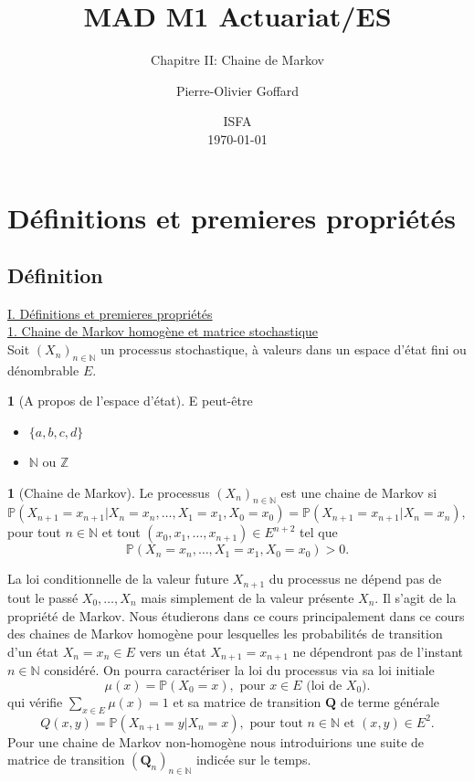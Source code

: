 \documentclass[8pt,notheorems]{beamer}
\title[]{MAD M1 Actuariat/ES}
\subtitle{Chapitre II: Chaine de Markov}
\author{Pierre-Olivier Goffard}
\institute{
	   Université de Lyon 1\\
	ISFA\\
	   \texttt{pierre-olivier.goffard@univ-lyon1.fr}
	  }
\date{
ISFA\\
\today}
\def \N{\mathbb N}
\def \P {\mathbb P}
\theoremstyle{definition}
\newtheorem{definition}{\translate{Definition}}
\theoremstyle{example}
\newtheorem{example}{\translate{Exemple}}
\theoremstyle{mystyle}
\theoremstyle{plain}
\begin{document}
\frame{\titlepage}


\section{Définitions et premieres propriétés}
\subsection{Définition}
\begin{frame}[allowframebreaks]
\underline{I. Définitions et premieres propriétés}\\
\underline{1. Chaine de Markov homogène et matrice stochastique}\\
Soit $(X_n)_{n\in\mathbb{N}}$ un processus stochastique, à valeurs dans un espace d'état fini ou dénombrable $E$.
\begin{example}[A propos de l'espace d'état]
E peut-être
\begin{itemize}
\item $\{a,b,c,d\}$
\item $\mathbb{N}$ ou $\mathbb{Z}$
\end{itemize}
\end{example}
\begin{definition}[Chaine de Markov]
Le processus $(X_n)_{n\in\mathbb{N}}$ est une chaine de Markov si
$$
\mathbb{P}(X_{n+1}=x_{n+1}|X_{n}=x_{n},\ldots,X_{1}=x_{1},X_{0}=x_{0})=\mathbb{P}(X_{n+1}=x_{n+1}|X_{n}=x_{n}),
$$
pour tout $n\in\mathbb{N}$ et tout $(x_{0},x_1,\ldots,x_{n+1})\in E^{n+2}$ tel que
$$
\mathbb{P}(X_{n}=x_{n},\ldots,X_{1}=x_{1},X_{0}=x_{0})>0.
$$
\end{definition}
La loi conditionnelle de la valeur future $X_{n+1}$ du processus ne dépend pas de tout le passé $X_0,\ldots, X_n$ mais simplement de la valeur présente $X_n$. Il s'agit de la propriété de Markov. Nous étudierons dans ce cours principalement dans ce cours des chaines de Markov homogène pour lesquelles les probabilités de transition d'un état $ X_{n}= x_n\in E$ vers un état $X_{n+1} = x_{n+1}$ ne dépendront pas de l'instant $n\in\N$ considéré. On pourra caractériser la loi du processus via sa loi initiale
$$
\mu(x) = \P(X_0 = x),\text{ pour }x\in E\text{ (loi de $X_0$)}.
$$
qui vérifie $\sum_{x\in E}\mu(x)=1$ et sa matrice de transition $\mathbf{Q}$ de terme générale
$$
Q(x,y) = \mathbb{P}(X_{n+1}= y|X_n = x), \text{ pour tout }n\in\N\text{ et }(x,y)\in E^2.
$$
Pour une chaine de Markov non-homogène nous introduirions une suite de matrice de transition $(\mathbf{Q}_n)_{n\in\N}$ indicée sur le temps.

\end{frame}
\end{document}
